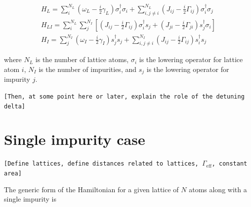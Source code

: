 \documentclass[aps,pra,superscriptaddress,twocolumn]{revtex4-1}
\newcommand{\commentSB}[1]{\texttt{\color{blue}[#1]}}
\newcommand{\commentSO}[1]{\texttt{\color{orange}[#1]}}
\newcommand{\commentTP}[1]{\texttt{\color{green}[#1]}}
\begin{document}
\begin{subequations}
    \begin{align}   
        H_L = \sum_i^{N_L} \left( \omega_L - \frac{i}{2} \gamma_L \right) \sigma_i^\dag \sigma_i + \sum_{i,j \neq i}^{N_L} \left( J_{ij} - \frac{i}{2} \Gamma_{ij} \right) \sigma_i^\dag \sigma_j \\
        H_{LI} = \sum_{i}^{N_L}  \sum_{j}^{N_I} \left[ \left( J_{ij} - \frac{i}{2} \Gamma_{ij} \right) \sigma_i^\dag s_j + \left( J_{ji} - \frac{i}{2} \Gamma_{ji} \right) s_j^\dag \sigma_i \right] \\
        H_I = \sum_j^{N_I} \left( \omega_I - \frac{i}{2} \gamma_I \right) s_j^\dag s_j + \sum_{i,j \neq i}^{N_I} \left( J_{ij} - \frac{i}{2} \Gamma_{ij} \right) s_i^\dag s_j
        \label{eqn:Hamiltonian}
    \end{align}
\end{subequations}

where $N_L$ is the number of lattice atoms, $\sigma_i$ is the lowering operator for lattice atom $i$, $N_I$ is the number of impurities, and $s_j$ is the lowering operator for impurity $j$. 


\commentSB{Then, at some point here or later, explain the role of the detuning delta}

\section{Single impurity case}
\commentSO{Define lattices, define distances related to lattices, $\Gamma_\mathrm{eff}$, constant area}



The generic form of the Hamiltonian for a given lattice of $N$ atoms along with a single impurity is 
\end{document}
